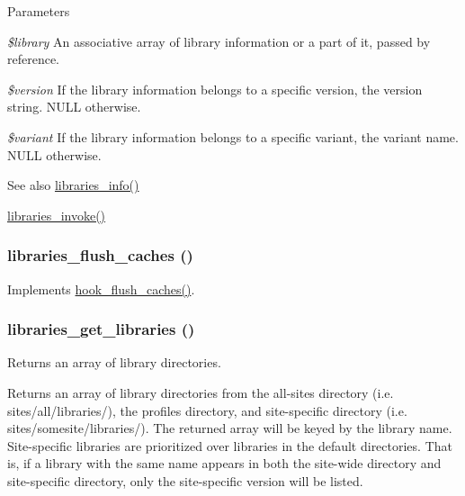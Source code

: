 \begin{DoxyParams}{Parameters}
\item[{\em \$library}]An associative array of library information or a part of it, passed by reference. \item[{\em \$version}]If the library information belongs to a specific version, the version string. NULL otherwise. \item[{\em \$variant}]If the library information belongs to a specific variant, the variant name. NULL otherwise.\end{DoxyParams}
\begin{DoxySeeAlso}{See also}
\hyperlink{libraries_8module_ae592b03bbea251cc7c008cd5ed10c861}{libraries\_\-info()} 

\hyperlink{libraries_8module_a3ac265c084e45903a8b9c4677d534f5b}{libraries\_\-invoke()} 
\end{DoxySeeAlso}
\hypertarget{libraries_8module_a1e8b67a9bc65c658aca7094765a1e1aa}{
\subsubsection[{libraries\_\-flush\_\-caches}]{\setlength{\rightskip}{0pt plus 5cm}libraries\_\-flush\_\-caches ()}}
\label{libraries_8module_a1e8b67a9bc65c658aca7094765a1e1aa}
Implements \hyperlink{group__hooks_ga66531e6e564157b7ca45ed07549c9b97}{hook\_\-flush\_\-caches()}. \hypertarget{libraries_8module_a7bb2b09cadaa8bb75d9d7ae892269cd0}{
\subsubsection[{libraries\_\-get\_\-libraries}]{\setlength{\rightskip}{0pt plus 5cm}libraries\_\-get\_\-libraries ()}}
\label{libraries_8module_a7bb2b09cadaa8bb75d9d7ae892269cd0}
Returns an array of library directories.

Returns an array of library directories from the all-\/sites directory (i.e. sites/all/libraries/), the profiles directory, and site-\/specific directory (i.e. sites/somesite/libraries/). The returned array will be keyed by the library name. Site-\/specific libraries are prioritized over libraries in the default directories. That is, if a library with the same name appears in both the site-\/wide directory and site-\/specific directory, only the site-\/specific version will be listed.

